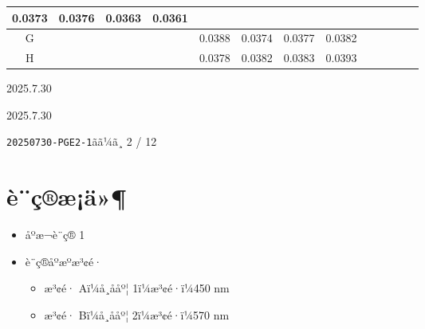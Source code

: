 \documentclass[UTF8,10pt,a4paper,fontset=fandol]{ctexart}
\newcommand{\fieldvalue}[1]{#1}
\newcommand{\handwritten}[1]{#1}
\begin{document}
\begin{center}
\begin{tabular}{c|c|c|c|c|c|c|c|c|c|c|c|c}
\fieldvalue{0.0373}&
\fieldvalue{0.0376}&
\fieldvalue{0.0363}&
\fieldvalue{0.0361}&&&\\ \hline
G&&&&
\fieldvalue{0.0388}&
\fieldvalue{0.0374}&
\fieldvalue{0.0377}&
\fieldvalue{0.0382}&&&\\ \hline
H&&&&
\fieldvalue{0.0378}&
\fieldvalue{0.0382}&
\fieldvalue{0.0383}&
\fieldvalue{0.0393}&&&
\end{tabular}
\end{center}

\vfill

\begin{flushright}
\handwritten{2025.7.30}

\handwritten{2025.7.30}
\end{flushright}

\newpage

\noindent\texttt{20250730-PGE2-1}\hfill ãã¼ã¸ 2 / 12

\section*{è¨ç®æ¡ä»¶}

\begin{itemize}
  \item åºæ¬è¨ç® 1
  \item è¨ç®åºæºæ³¢é·
  \begin{itemize}
    \item æ³¢é· Aï¼å¸ååº¦ 1ï¼æ³¢é·ï¼450 nm
    \item æ³¢é· Bï¼å¸ååº¦ 2ï¼æ³¢é·ï¼570 nm
  \end{itemize}
\end{itemize}
\end{document}
